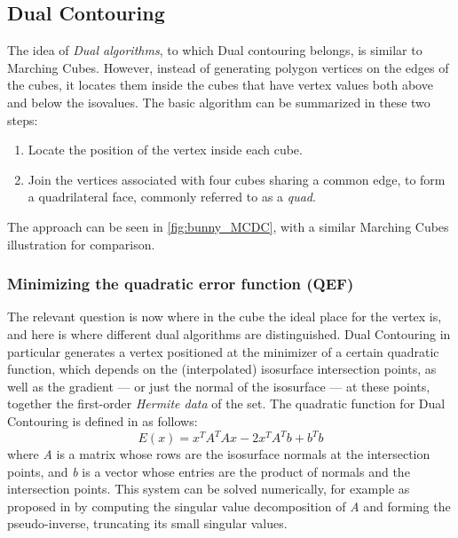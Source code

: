 \subsection{Dual Contouring}
The idea of \emph{Dual algorithms}, to which Dual contouring belongs, is similar to Marching Cubes. However, instead of generating polygon vertices on the
edges of the cubes, it locates them inside the cubes that have vertex values both above and below the isovalues. The basic algorithm can be summarized in these two steps:
\begin{enumerate}
\item Locate the position of the vertex inside each cube.
\item Join the vertices associated with four cubes sharing a common edge, to form a quadrilateral face, commonly referred to as a \emph{quad}.
\end{enumerate}
The approach can be seen in \autoref{fig:bunny_MCDC}, with a similar Marching Cubes illustration for comparison. 

\subsubsection{Minimizing the quadratic error function (QEF)}
The relevant question is now where in the cube the ideal place for the vertex is, and here is where different dual algorithms are distinguished. Dual Contouring in particular generates a vertex positioned at the minimizer of a certain quadratic function, which depends on the (interpolated) isosurface intersection points, as well as the gradient --- or just the normal of the isosurface --- at these points, together the first-order \emph{Hermite data} of the set.
The quadratic function for Dual Contouring is defined in \cite{Hermite2002} as follows:
\begin{equation*}
E(x)= x^TA^TAx-2x^TA^Tb+b^Tb
\end{equation*}
where \textit{A} is a matrix whose rows are the isosurface normals at the intersection points, and \textit{b} is a vector whose entries are the product of normals and the intersection points. This system can be solved numerically, for example as proposed in \cite{Hermite2002} by computing the singular value decomposition of \textit{A} and forming the pseudo-inverse, truncating its small singular values. 


